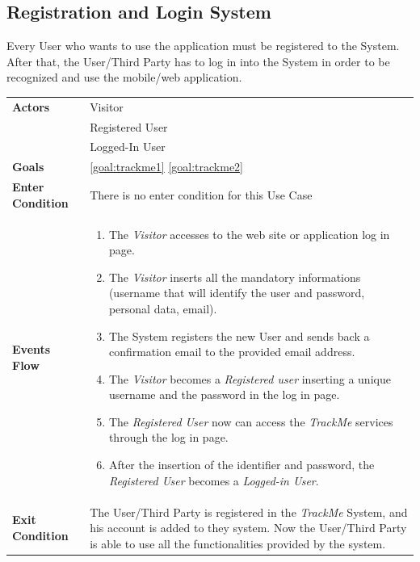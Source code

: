   \subsection{Registration and Login System}
Every User who wants to use the application must be registered to the System.
After that, the User/Third Party has to log in into the System in order to be recognized and use the mobile/web application.

\begin{table}[H]
	\centering
    
    \begin{tabular}{|p{3.5cm}|p{10.3cm}|}
    
    \hline
    \textbf{\large{Actors}}  			& \tabitem Visitor\\
    				 					& \tabitem Registered User\\
                     					& \tabitem Logged-In User\\
    \hline
    \textbf{\large{Goals}} 				& \ref{goal:trackme1}                                                     \ref{goal:trackme2}\\
    
    \hline
    \textbf{\large{Enter Condition}}	& There is no enter condition for this Use Case		\\
    
    \hline
    \textbf{\large{Events Flow}}		& \begin{enumerate}[leftmargin=0.5cm]
                                          	\item The \emph{Visitor}  accesses to the web site or application log in page.
                                            \item The \emph{Visitor} inserts all the mandatory informations (username that will identify the user and password, personal data, email).
                                            \item The System registers the new User and sends back a confirmation email to the provided email address.
                                            \item The \emph{Visitor} becomes a \emph{Registered user} inserting a unique username and the password in the log in page.  
                                            \item The \emph{Registered User} now can access the \emph{TrackMe} services through the log in page.
                                            \item After the insertion of the identifier and password, the \emph{Registered User} becomes a \emph{Logged-in User}.
                                          \end{enumerate}
    										\\
    \hline
    \textbf{\large{Exit Condition}} 	& The User/Third Party is registered in the \emph{TrackMe} System, and his account is added to they system. Now the User/Third Party is able to use all the functionalities provided by the system. \\
    

\end{tabular}
\end{table}
